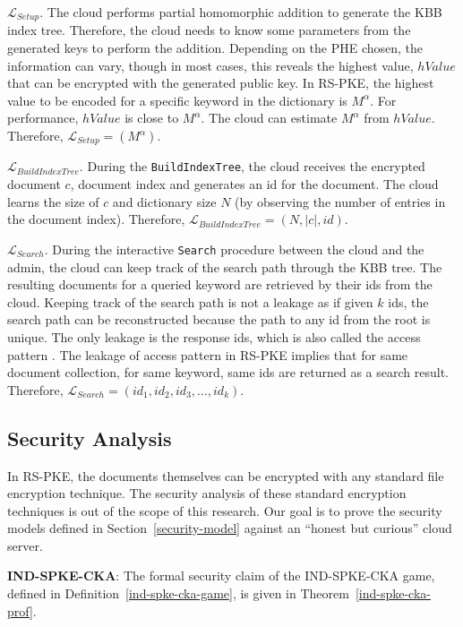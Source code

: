 \documentclass[sigconf,pdftex]{acmart}
\begin{document}
$\mathcal{L}_{Setup}$. The cloud performs partial homomorphic addition to generate the KBB index tree. Therefore, the cloud needs to know some parameters from the generated keys to perform the addition. Depending on the PHE chosen, the information can vary, though in most cases, this reveals the highest value, $hValue$ that can be encrypted with the generated public key. In RS-PKE, the highest value to be encoded for a specific keyword in the dictionary is $M^\alpha$. For performance, $hValue$ is close to $M^\alpha$. The cloud can estimate $M^\alpha$ from $hValue$. Therefore, $\mathcal{L}_{Setup} = (M^\alpha)$.


$\mathcal{L}_{BuildIndexTree}$. During the \texttt{BuildIndexTree}, the cloud receives the encrypted document $c$, document index and generates an id for the document. The cloud learns the size of $c$ and dictionary size $N$ (by observing the number of entries in the document index). Therefore, $\mathcal{L}_{BuildIndexTree} = (N, |c|, id)$.


$\mathcal{L}_{Search}$. During the interactive \texttt{Search} procedure between the cloud and the admin, the cloud can keep track of the search path through the KBB tree. The resulting documents for a queried keyword are retrieved by their ids from the cloud. Keeping track of the search path is not a leakage as if given $k$ ids, the search path can be reconstructed because the path to any id from the root is unique. The only leakage is the response ids, which is also called the access pattern \cite{Islam2012AccessPD}. The leakage of access pattern in RS-PKE implies that for same document collection, for same keyword, same ids are returned as a search result. Therefore, $\mathcal{L}_{Search} = (id_1, id_2, id_3,\dots,id_k)$.

 

\subsection{Security Analysis}\label{sec-prof}


In RS-PKE, the documents themselves can be encrypted with any standard file encryption technique. The security analysis of these standard encryption techniques is out of the scope of this research. Our goal is to prove the security models defined in Section~\ref{security-model} against an ``honest but curious'' cloud server.




\textbf{IND-SPKE-CKA}: The formal security claim of the IND-SPKE-CKA game, defined in Definition~\ref{ind-spke-cka-game}, is given in Theorem~\ref{ind-spke-cka-prof}.
\end{document}
